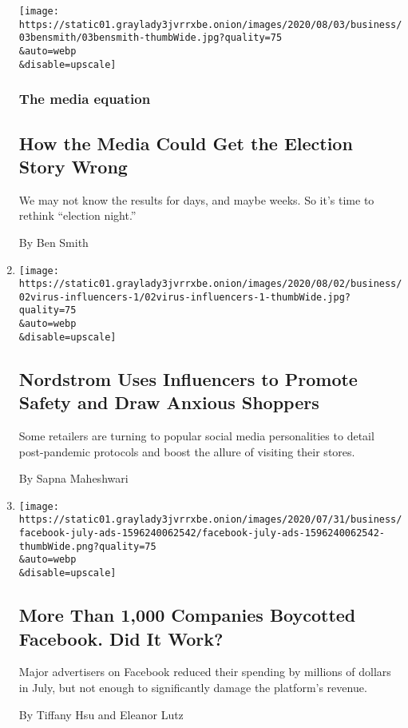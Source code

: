 \begin{enumerate}
  \texttt{[image: https://static01.graylady3jvrrxbe.onion/images/2020/08/03/business/03bensmith/03bensmith-thumbWide.jpg?quality=75\\\&auto=webp\\\&disable=upscale]}

  \hypertarget{the-media-equation}{%
  \subsubsection{The media equation}\label{the-media-equation}}

  \hypertarget{how-the-media-could-get-the-election-story-wrong}{%
  \subsection{How the Media Could Get the Election Story
  Wrong}\label{how-the-media-could-get-the-election-story-wrong}}

  We may not know the results for days, and maybe weeks. So it's time to
  rethink ``election night.''

  By Ben Smith
\item
  \href{/2020/08/02/business/media/coronavirus-nordstrom-infuencers.html}{}

  \texttt{[image: https://static01.graylady3jvrrxbe.onion/images/2020/08/02/business/02virus-influencers-1/02virus-influencers-1-thumbWide.jpg?quality=75\\\&auto=webp\\\&disable=upscale]}

  \hypertarget{nordstrom-uses-influencers-to-promote-safety-and-draw-anxious-shoppers}{%
  \subsection{Nordstrom Uses Influencers to Promote Safety and Draw
  Anxious
  Shoppers}\label{nordstrom-uses-influencers-to-promote-safety-and-draw-anxious-shoppers}}

  Some retailers are turning to popular social media personalities to
  detail post-pandemic protocols and boost the allure of visiting their
  stores.

  By Sapna Maheshwari
\item
  \href{/2020/08/01/business/media/facebook-boycott.html}{}

  \texttt{[image: https://static01.graylady3jvrrxbe.onion/images/2020/07/31/business/facebook-july-ads-1596240062542/facebook-july-ads-1596240062542-thumbWide.png?quality=75\\\&auto=webp\\\&disable=upscale]}

  \hypertarget{more-than-1000-companies-boycotted-facebook-did-it-work}{%
  \subsection{More Than 1,000 Companies Boycotted Facebook. Did It
  Work?}\label{more-than-1000-companies-boycotted-facebook-did-it-work}}

  Major advertisers on Facebook reduced their spending by millions of
  dollars in July, but not enough to significantly damage the platform's
  revenue.

  By Tiffany Hsu and Eleanor Lutz
\end{enumerate}

